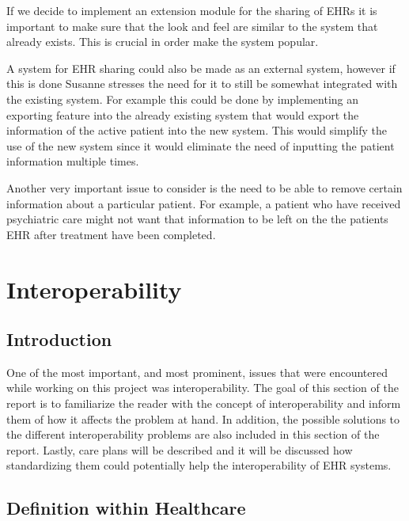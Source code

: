 \documentclass[14pt]{article}
\begin{document}
If we decide to implement an extension module for the sharing of \glspl{EHR} it is important to make sure that the look and feel are similar to the system that already exists. This is crucial in order make the system popular. 

A system for \gls{EHR} sharing could also be made as an external system, however if this is done Susanne stresses the need for it to still be somewhat integrated with the existing system. For example this could be done by implementing an exporting feature into the already existing system that would export the information of the active patient into the new system. This would simplify the use of the new system since it would eliminate the need of inputting the patient information multiple times.

Another very important issue to consider is the need to be able to remove certain information about a particular patient. For example, a patient who have received psychiatric care might not want that information to be left on the the patients \gls{EHR} after treatment have been completed\cite{EPJ1}.


\newpage

\section{Interoperability}
\label{sec:Interoperability}

\subsection{Introduction} 

One of the most important, and most prominent, issues that were encountered while working on this project was interoperability.  The goal of this section of the report is to familiarize the reader with the concept of interoperability and inform them of how it affects the problem at hand.  In addition, the possible solutions to the different interoperability problems are also included in this section of the report.  Lastly, care plans will be described and it will be discussed how standardizing them could potentially help the interoperability of \gls{EHR} systems.

\subsection{Definition within Healthcare} 

\end{document}

